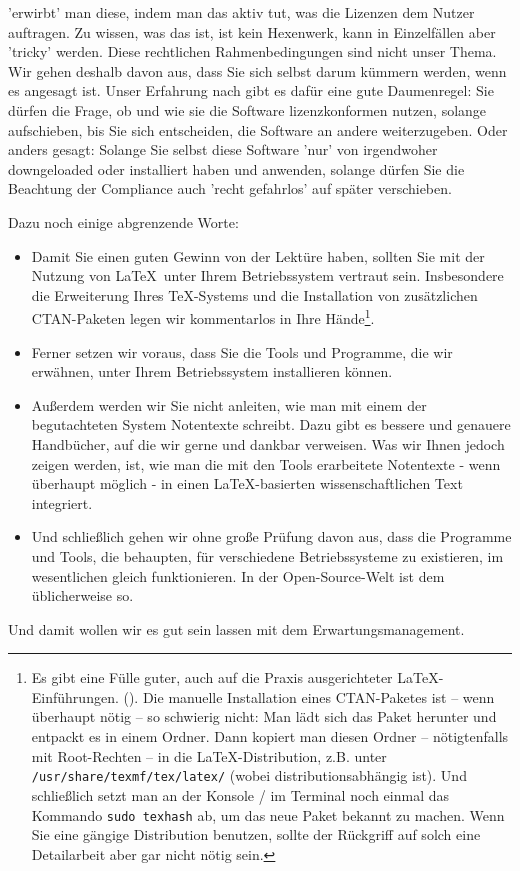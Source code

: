 {'erwirbt' man diese, indem man das aktiv tut, was die Lizenzen dem Nutzer
auftragen. Zu wissen, was das ist, ist kein Hexenwerk, kann in Einzelfällen aber
'tricky' werden. Diese rechtlichen Rahmenbedingungen sind nicht unser Thema. Wir
gehen deshalb davon aus, dass Sie sich selbst darum kümmern werden, wenn es
angesagt ist. Unser Erfahrung nach gibt es dafür eine gute Daumenregel: Sie
dürfen die Frage, ob und wie sie die Software lizenzkonformen nutzen, solange
aufschieben, bis Sie sich entscheiden, die Software an andere weiterzugeben.
Oder anders gesagt: Solange Sie selbst diese Software 'nur' von irgendwoher
downgeloaded oder installiert haben und anwenden, solange dürfen Sie die
Beachtung der Compliance auch 'recht gefahrlos' auf später verschieben.}

Dazu noch einige abgrenzende Worte:
\begin{itemize}
  \item Damit Sie einen guten Gewinn von der Lektüre haben, sollten Sie mit der
  Nutzung von \LaTeX\ unter Ihrem Betriebssystem vertraut sein.
  Insbesondere die Erweiterung Ihres \TeX-Systems und die Installation von
  zusätzlichen CTAN-Paketen legen wir kommentarlos in Ihre Hände\footnote{Es
  gibt eine Fülle guter, auch auf die Praxis ausgerichteter \LaTeX-Einführungen.
  (\cite[etwa][7ff]{Schlosser2016a}). Die ma\-nuelle Installation eines
  CTAN-Paketes ist -- wenn überhaupt nötig -- so schwierig nicht: Man lädt sich das
  Paket herunter und entpackt es in einem Ordner. Dann kopiert man diesen Ordner
  -- nötigtenfalls mit Root-Rechten -- in die \LaTeX-Distribution, z.B. unter
  \texttt{/usr/share/texmf/tex/latex/} (wobei 
  distributionsabhängig ist). Und schließlich setzt man an der Konsole / im
  Terminal noch einmal das Kommando \texttt{sudo texhash} ab, um das neue Paket
  bekannt zu machen. Wenn Sie eine gängige Distribution benutzen, sollte der
  Rückgriff auf solch eine Detailarbeit aber gar nicht nötig sein.}.
  \item Ferner setzen wir voraus, dass Sie die Tools und Programme, die wir
  erwähnen, unter Ihrem Betriebssystem installieren können.
  \item Außerdem werden wir Sie nicht anleiten, wie man mit einem der
  begutachteten System Notentexte schreibt. Dazu gibt es bessere und genauere
  Handbücher, auf die wir gerne und dankbar verweisen. Was wir Ihnen jedoch
  zeigen werden, ist, wie man die mit den Tools erarbeitete Notentexte - wenn
  überhaupt möglich - in einen \LaTeX-basierten wissenschaftlichen Text
  integriert.
  \item Und schließlich gehen wir ohne große Prüfung davon aus, dass die
  Programme und Tools, die behaupten, für verschiedene Betriebssysteme zu
  existieren, im wesentlichen gleich funktionieren. In der Open-Source-Welt ist
  dem üblicherweise so.
\end{itemize}

Und damit wollen wir es gut sein lassen mit dem Erwartungsmanagement.



%
